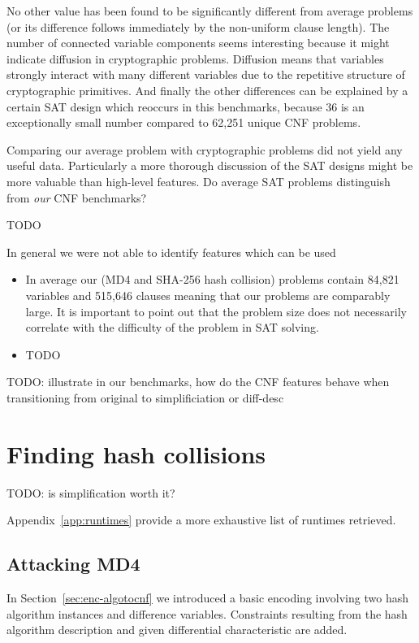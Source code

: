 No other value has been found to be significantly different from
average problems (or its difference follows immediately by the
non-uniform clause length). The number of connected variable
components seems interesting because it might indicate diffusion
in cryptographic problems. Diffusion means that variables strongly
interact with many different variables due to the repetitive
structure of cryptographic primitives. And finally the other
differences can be explained by a certain SAT design which
reoccurs in this benchmarks, because 36 is an exceptionally small
number compared to 62,251 unique CNF problems.

Comparing our average problem with cryptographic problems did
not yield any useful data. Particularly a more thorough discussion
of the SAT designs might be more valuable than high-level features.
Do average SAT problems distinguish from \emph{our} CNF benchmarks?

TODO


In general we were not able to identify features
which can be used
\begin{itemize}
  \item In average our (MD4 and SHA-256 hash collision) problems contain
        84,821 variables and 515,646 clauses meaning that our problems
        are comparably large. It is important to point out that the
        problem size does not necessarily correlate with the difficulty
        of the problem in SAT solving.
  \item TODO
\end{itemize}

TODO: illustrate in our benchmarks, how do the CNF features behave when transitioning from original to simplificiation or diff-desc

\section{Finding hash collisions}
\label{sec:results-attacks}

TODO: is simplification worth it?

Appendix~\ref{app:runtimes} provide a more exhaustive list of runtimes retrieved.

\subsection{Attacking MD4}
\label{sec:results-md4}
%
In Section~\ref{sec:enc-algotocnf} we introduced a basic encoding involving two hash algorithm
instances and difference variables. Constraints resulting from the hash algorithm description
and given differential characteristic are added.

